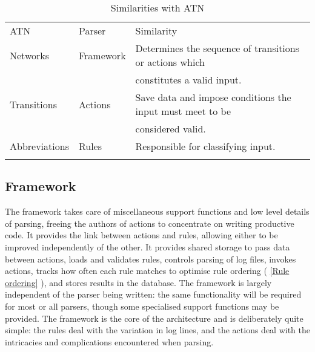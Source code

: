 \documentclass[draft]{svmult}
\newcommand{\sectionref}[1]{%
    \textsection{}\vref*{#1}%
}
\begin{document}

\begin{table}[ht]
    \caption{Similarities with ATN}\label{Similarities with ATN}
    \begin{tabular}[]{lll}
        \hline
        \noalign{\smallskip}
        ATN           & Parser    & Similarity                          \\
        \noalign{\smallskip}
        \hline
        \noalign{\smallskip}
        Networks      & Framework & Determines the sequence of
                                    transitions or actions which        \\
                      &           & constitutes a valid input.          \\
        Transitions   & Actions   & Save data and impose conditions the
                                    input must meet to be               \\
                      &           & considered valid.                   \\
        Abbreviations & Rules     & Responsible for classifying input.  \\
        \noalign{\smallskip}
        \hline
        \noalign{\smallskip}
    \end{tabular}
\end{table}

\subsection{Framework}

\label{Framework}

The framework takes care of miscellaneous support functions and low level
details of parsing, freeing the authors of actions to concentrate on
writing productive code.  It provides the link between actions and rules,
allowing either to be improved independently of the other.  It provides
shared storage to pass data between actions, loads and validates rules,
controls parsing of log files, invokes actions, tracks how often each rule
matches to optimise rule ordering (\sectionref{Rule ordering}), and stores
results in the database.  The framework is largely independent of the
parser being written: the same functionality will be required for most or
all parsers, though some specialised support functions may be provided.
The framework is the core of the architecture and is deliberately quite
simple: the rules deal with the variation in log lines, and the actions
deal with the intricacies and complications encountered when parsing.
\end{document}
